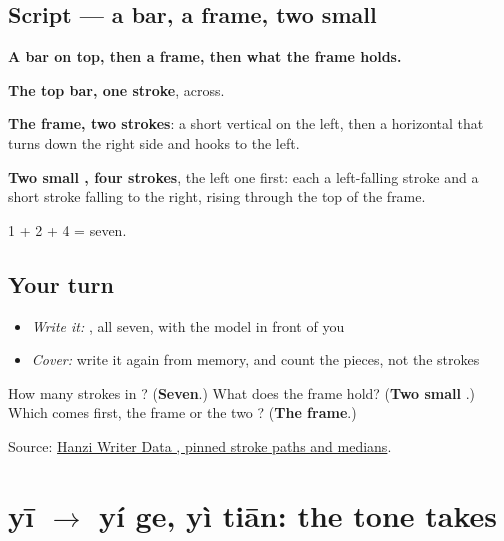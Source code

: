 \subsection*{Script — a bar, a frame, two small }

\begin{quote}
\end{quote}

\textbf{A bar on top, then a frame, then what the frame holds.}

\textbf{The top bar, one stroke}, across.

\textbf{The frame, two strokes}: a short vertical on the left, then a horizontal that turns down the right side and hooks to the left.

\textbf{Two small , four strokes}, the left one first: each a left-falling stroke and a short stroke falling to the right, rising through the top of the frame.

1 + 2 + 4 = seven.

\subsection*{Your turn}
\begin{itemize}
\raggedright
  \item \emph{Write it:} , all seven, with the model in front of you
  \item \emph{Cover:} write it again from memory, and count the pieces, not the strokes
\end{itemize}

\begin{tcolorbox}[breakable,colback=teal!4,colframe=teal!35!black,title={Before you move on}]
How many strokes in ? (\textbf{Seven}.) What does the frame hold? (\textbf{Two small }.) Which comes first, the frame or the two ? (\textbf{The frame}.)

Source: \href{https://raw.githubusercontent.com/chanind/hanzi-writer-data/68d10a4b21150cae5e1ebbd223eed289cf32d90c/data/\%E4\%B8\%A4.json}{Hanzi Writer Data , pinned stroke paths and medians}.
\end{tcolorbox}
\section[yī to yí ge, yì tiān (yí ge, yì tiān)]{yī $\to$ yí ge, yì tiān: the tone  takes}

